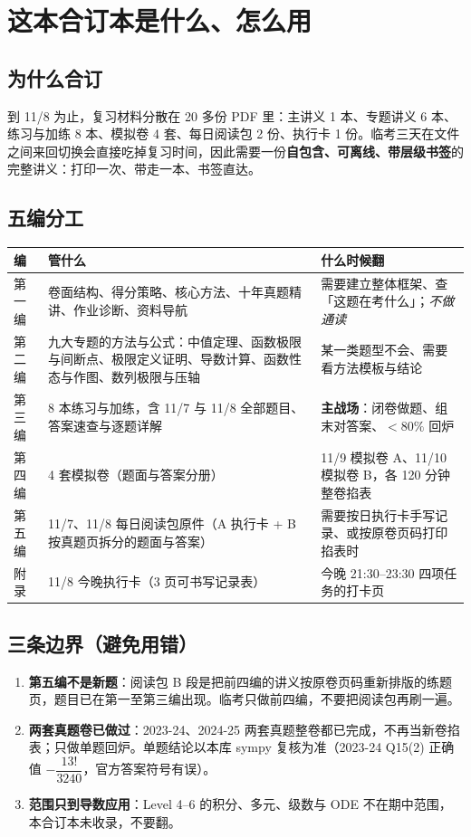 \documentclass[11pt,a4paper]{ctexart}
\newcommand{\key}[1]{\textbf{#1}}
\begin{document}
\newpage
\section{这本合订本是什么、怎么用}

\subsection{为什么合订}
到 11/8 为止，复习材料分散在 20 多份 PDF 里：主讲义 1 本、专题讲义 6 本、练习与加练 8 本、模拟卷 4 套、每日阅读包 2 份、执行卡 1 份。临考三天在文件之间来回切换会直接吃掉复习时间，因此需要一份\key{自包含、可离线、带层级书签}的完整讲义：打印一次、带走一本、书签直达。

\subsection{五编分工}
\begin{longtable}{@{}p{2.4cm}p{4.2cm}p{8.4cm}@{}}
\toprule
\textbf{编} & \textbf{管什么} & \textbf{什么时候翻} \\
\midrule
第一编 & 卷面结构、得分策略、核心方法、十年真题精讲、作业诊断、资料导航 & 需要建立整体框架、查「这题在考什么」；\emph{不做通读} \\
第二编 & 九大专题的方法与公式：中值定理、函数极限与间断点、极限定义证明、导数计算、函数性态与作图、数列极限与压轴 & 某一类题型不会、需要看方法模板与结论 \\
第三编 & 8 本练习与加练，含 11/7 与 11/8 全部题目、答案速查与逐题详解 & \textbf{主战场}：闭卷做题、组末对答案、$<80\%$ 回炉 \\
第四编 & 4 套模拟卷（题面与答案分册） & 11/9 模拟卷 A、11/10 模拟卷 B，各 120 分钟整卷掐表 \\
第五编 & 11/7、11/8 每日阅读包原件（A 执行卡 + B 按真题页拆分的题面与答案） & 需要按日执行卡手写记录、或按原卷页码打印掐表时 \\
附录 & 11/8 今晚执行卡（3 页可书写记录表） & 今晚 21:30--23:30 四项任务的打卡页 \\
\bottomrule
\end{longtable}

\subsection{三条边界（避免用错）}
\begin{enumerate}
\item \key{第五编不是新题}：阅读包 B 段是把前四编的讲义按原卷页码重新排版的练题页，题目已在第一至第三编出现。临考只做前四编，不要把阅读包再刷一遍。
\item \key{两套真题卷已做过}：2023-24、2024-25 两套真题整卷都已完成，不再当新卷掐表；只做单题回炉。单题结论以本库 sympy 复核为准（2023-24 Q15(2) 正确值 $-\dfrac{13!}{3240}$，官方答案符号有误）。
\item \key{范围只到导数应用}：Level 4--6 的积分、多元、级数与 ODE 不在期中范围，本合订本未收录，不要翻。
\end{enumerate}
\end{document}

